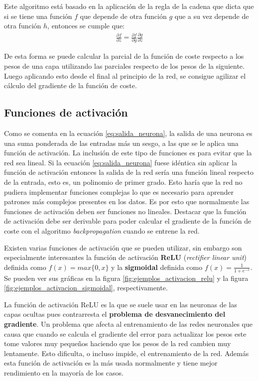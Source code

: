Este algoritmo está basado en la aplicación de la regla de la cadena que dicta que si se tiene una función $f$ que depende de otra función $g$ que a su vez depende de otra función $h$, entonces se cumple que:
\begin{align*}
\frac{\partial f}{\partial z} = \frac{\partial f}{\partial g} \frac{\partial g}{\partial z}
\end{align*}

De esta forma se puede calcular la parcial de la función de coste respecto a los pesos de una capa utilizando las parciales respecto de los pesos de la siguiente. Luego aplicando esto desde el final al principio de la red, se consigue agilizar el cálculo del gradiente de la función de coste.

\subsection*{Funciones de activación}

Como se comenta en la ecuación \eqref{eq:salida_neurona}, la salida de una neurona es una suma ponderada de las entradas más un sesgo, a las que se le aplica una función de activación. La inclusión de este tipo de funciones es para evitar que la red sea lineal. Si la ecuación \eqref{eq:salida_neurona} fuese idéntica sin aplicar la función de activación entonces la salida de la red sería una función lineal respecto de la entrada, esto es, un polinomio de primer grado. Esto haría que la red no pudiera implementar funciones complejas lo que es necesario para aprender patrones más complejos presentes en los datos.  Es por esto que normalmente las funciones de activación deben ser funciones no lineales. Destacar que la función de activación debe ser derivable para poder calcular el gradiente de la función de coste con el algoritmo \textit{backpropagation} cuando se entrene la red.

Existen varias funciones de activación que se pueden utilizar, sin embargo son especialmente interesantes la función de activación \textbf{ReLU} (\textit{rectifier linear unit}) definida como $ f(x) = max\{0,x\}$ y la \textbf{sigmoidal} definida como $f(x) = \frac{1}{1+e^{-x}}$. Se pueden ver sus gráficas en la figura \ref{fig:ejemplos_activacion_relu} y la figura \ref{fig:ejemplos_activacion_sigmoidal}, respectivamente.

La función de activación ReLU es la que se suele usar en las neuronas de las capas ocultas pues contrarresta el \textbf{problema de desvanecimiento del gradiente}. Un problema que afecta al entrenamiento de las redes neuronales que causa que cuando se calcula el gradiente del error para actualizar los pesos este tome valores muy pequeños haciendo que los pesos de la red cambien muy lentamente. Esto dificulta, o incluso impide, el entrenamiento de la red. Además esta función de activación es la más usada normalmente y tiene mejor rendimiento en la mayoría de los casos.

